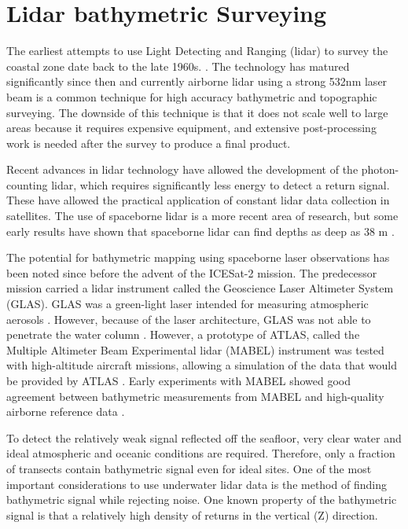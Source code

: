 \section{Lidar bathymetric Surveying}

The earliest attempts to use Light Detecting and Ranging (lidar) to survey the coastal zone date back to the late 1960s. \parencite{Bailly2016}. The technology has matured significantly since then and currently airborne lidar using a strong 532nm laser beam is a common technique for high accuracy bathymetric and topographic surveying. The downside of this technique is that it does not scale well to large areas because it requires expensive equipment, and extensive post-processing work is needed after the survey to produce a final product. 

Recent advances in lidar technology have allowed the development of the photon-counting lidar, which requires significantly less energy to detect a return signal. These have allowed the practical application of constant lidar data collection in satellites. The use of spaceborne lidar is a more recent area of research, but some early results have shown that spaceborne lidar can find depths as deep as 38 m \parencite{Parrish2019}.

The potential for bathymetric mapping using spaceborne laser observations has been noted since before the advent of the ICESat-2 mission. The predecessor mission carried a lidar instrument called the Geoscience Laser Altimeter System (GLAS). GLAS was a green-light laser intended for measuring atmospheric aerosols \parencite{Abshire2005}. However, because of the laser architecture, GLAS was not able to penetrate the water column \parencite{Forfinski-Sarkozi2016}. However, a prototype of ATLAS, called the Multiple Altimeter Beam Experimental lidar (MABEL) instrument was tested with high-altitude aircraft missions, allowing a simulation of the data that would be provided by ATLAS \parencite{Mcgill2013}. Early experiments with MABEL showed good agreement between bathymetric measurements from MABEL and high-quality airborne reference data \parencite{Jasinski2016,Forfinski-Sarkozi2016}.

To detect the relatively weak signal reflected off the seafloor, very clear water and ideal atmospheric and oceanic conditions are required. Therefore, only a fraction of transects contain bathymetric signal even for ideal sites. One of the most important considerations to use underwater lidar data is the method of finding bathymetric signal while rejecting noise. One known property of the bathymetric signal is that a relatively high density of returns in the vertical (Z) direction. 


